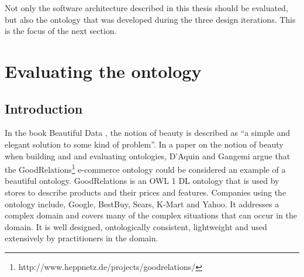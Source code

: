 Not only the software architecture described in this thesis should be evaluated, but also the ontology that was developed during the three design iterations. This is the focus of the next section.





\section{Evaluating the ontology}

\subsection{Introduction}

% 

In the book Beautiful Data \cite{Segaran2009}, the notion of beauty is described as ``a simple and elegant solution to some kind of problem''. In a paper on the notion of beauty when building and and evaluating ontologies, D'Aquin and Gangemi \cite{DAquin2011} argue that the GoodRelations\footnote{http://www.heppnetz.de/projects/goodrelations/}\label{goodrelations} e-commerce ontology could be considered an example of a beautiful ontology. GoodRelations is an \ac{OWL} 1 DL ontology that is used by stores to describe products and their prices and features. Companies using the ontology include, Google, BestBuy, Sears, K-Mart and Yahoo. It addresses a complex domain and covers many of the complex situations that can occur in the domain. It is well designed, ontologically consistent, lightweight and used extensively by practitioners in the domain. 

